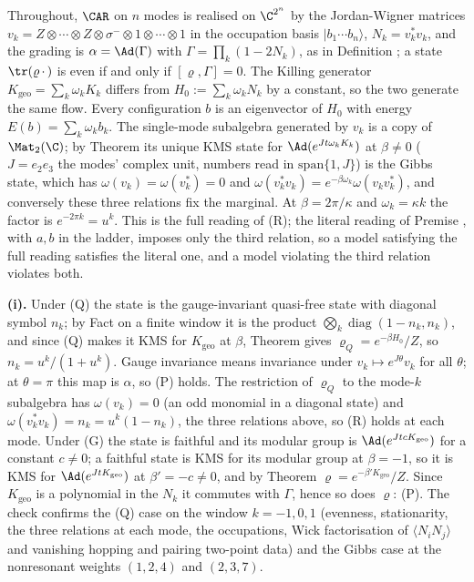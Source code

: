 Throughout, $\CAR$ on $n$ modes is realised on $\C^{2^{n}}$ by the Jordan-Wigner matrices $v_k = Z \otimes \cdots \otimes Z \otimes \sigma^{-} \otimes 1 \otimes \cdots \otimes 1$ in the occupation basis $|b_1 \cdots b_n\rangle$, $N_k = v_k^{*}v_k$, and the grading is $\alpha = \Ad(\Gamma)$ with $\Gamma = \prod_k (1 - 2N_k)$, as in Definition ; a state $\tr(\varrho\,\cdot\,)$ is even if and only if $[\varrho, \Gamma] = 0$. The Killing generator $K_{\mathrm{geo}} = \sum_k\omega_kK_k$ differs from $H_0 := \sum_k\omega_kN_k$ by a constant, so the two generate the same flow. Every configuration $b$ is an eigenvector of $H_0$ with energy $E(b) = \sum_k\omega_kb_k$. The single-mode subalgebra generated by $v_k$ is a copy of $\Mat_2(\C)$; by Theorem  its unique KMS state for $\Ad(e^{Jt\omega_kK_k})$ at $\beta \neq 0$ ($J = e_{2}e_{3}$ the modes' complex unit, numbers read in $\mathrm{span}\{1, J\}$) is the Gibbs state, which has $\omega(v_k) = \omega(v_k^{*}) = 0$ and $\omega(v_k^{*}v_k) = e^{-\beta\omega_k}\omega(v_kv_k^{*})$, and conversely these three relations fix the marginal. At $\beta = 2\pi/\kappa$ and $\omega_k = \kappa k$ the factor is $e^{-2\pi k} = u^{k}$. This is the full reading of (R); the literal reading of Premise , with $a, b$ in the ladder, imposes only the third relation, so a model satisfying the full reading satisfies the literal one, and a model violating the third relation violates both.

\textbf{(i).} Under (Q) the state is the gauge-invariant quasi-free state with diagonal symbol $n_k$; by Fact  on a finite window it is the product $\bigotimes_k\operatorname{diag}(1 - n_k, n_k)$, and since (Q) makes it KMS for $K_{\mathrm{geo}}$ at $\beta$, Theorem  gives $\varrho_Q = e^{-\beta H_0}/Z$, so $n_k = u^{k}/(1 + u^{k})$. Gauge invariance means invariance under $v_k \mapsto e^{J\theta}v_k$ for all $\theta$; at $\theta = \pi$ this map is $\alpha$, so (P) holds. The restriction of $\varrho_Q$ to the mode-$k$ subalgebra has $\omega(v_k) = 0$ (an odd monomial in a diagonal state) and $\omega(v_k^{*}v_k) = n_k = u^{k}(1 - n_k)$, the three relations above, so (R) holds at each mode. Under (G) the state is faithful and its modular group is $\Ad(e^{JtcK_{\mathrm{geo}}})$ for a constant $c \neq 0$; a faithful state is KMS for its modular group at $\beta = -1$, so it is KMS for $\Ad(e^{JtK_{\mathrm{geo}}})$ at $\beta' = -c \neq 0$, and by Theorem  $\varrho = e^{-\beta' K_{\mathrm{geo}}}/Z$. Since $K_{\mathrm{geo}}$ is a polynomial in the $N_k$ it commutes with $\Gamma$, hence so does $\varrho$: (P). The check confirms the (Q) case on the window $k = -1, 0, 1$ (evenness, stationarity, the three relations at each mode, the occupations, Wick factorisation of $\langle N_iN_j\rangle$ and vanishing hopping and pairing two-point data) and the Gibbs case at the nonresonant weights $(1, 2, 4)$ and $(2, 3, 7)$.


